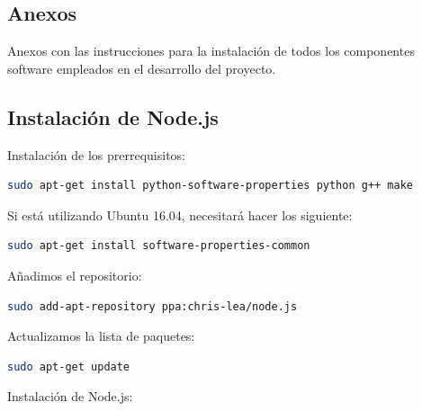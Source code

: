 

\newpage

  \begin{appendices}
\backmatter

\chapter{Anexos}
\label{appendix:anexos}


Anexos con las instrucciones para la instalación de todos los componentes software empleados en el desarrollo del proyecto.\\

\section{Instalación de Node.js}


Instalación de los prerrequisitos:\\

\begin{lstlisting}[language=bash]
sudo apt-get install python-software-properties python g++ make
\end{lstlisting}


Si está utilizando Ubuntu 16.04, necesitará hacer los siguiente:\\

\begin{lstlisting}[language=bash]
sudo apt-get install software-properties-common
\end{lstlisting}


Añadimos el repositorio:\\

\begin{lstlisting}[language=bash]
sudo add-apt-repository ppa:chris-lea/node.js
\end{lstlisting}

Actualizamos la lista de paquetes:\\

\begin{lstlisting}[language=bash]
sudo apt-get update
\end{lstlisting}

Instalación de  Node.js:\\


\end{appendices}
